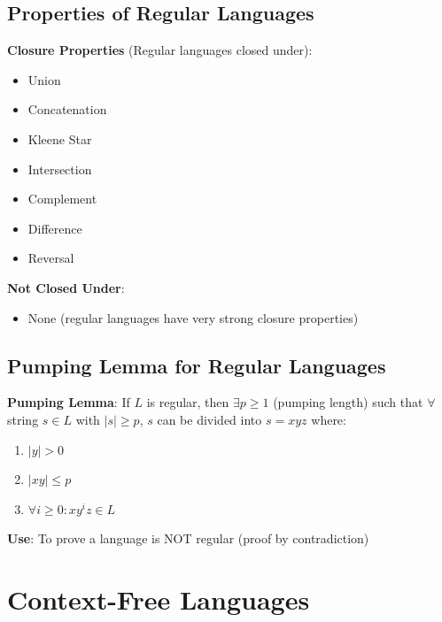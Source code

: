 \documentclass[12pt,a4paper]{report}
\begin{document}
\subsection{Properties of Regular Languages}
\begin{concept}
\textbf{Closure Properties} (Regular languages closed under):
\begin{itemize}
    \item Union
    \item Concatenation
    \item Kleene Star
    \item Intersection
    \item Complement
    \item Difference
    \item Reversal
\end{itemize}

\textbf{Not Closed Under}:
\begin{itemize}
    \item None (regular languages have very strong closure properties)
\end{itemize}
\end{concept}

\subsection{Pumping Lemma for Regular Languages}
\begin{theorem}
\textbf{Pumping Lemma}: If $L$ is regular, then $\exists p \geq 1$ (pumping length) such that $\forall$ string $s \in L$ with $|s| \geq p$, $s$ can be divided into $s = xyz$ where:
\begin{enumerate}
    \item $|y| > 0$
    \item $|xy| \leq p$
    \item $\forall i \geq 0: xy^iz \in L$
\end{enumerate}

\textbf{Use}: To prove a language is NOT regular (proof by contradiction)
\end{theorem}

\section{Context-Free Languages}
\end{document}
